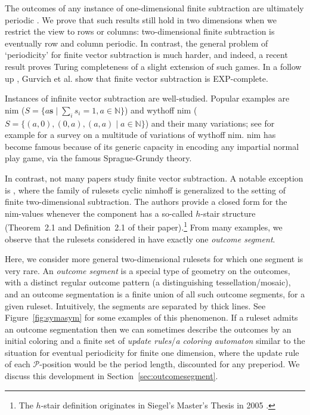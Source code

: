 \documentclass{amsart}
\theoremstyle{plain}
\theoremstyle{definition}
\renewcommand{\P}{\ensuremath{\mathcal P}}
\newcommand{\n}{\mathbb N}
\newcommand{\s}{\boldsymbol s}
\begin{document}
The outcomes of any instance of {\sc one-dimensional finite subtraction} are ultimately periodic \cite{golomb1966mathematical}. We prove that such results still hold in two dimensions when we restrict the view to rows or columns: {\sc two-dimensional finite subtraction} is eventually row and column periodic. In contrast, the general problem of `periodicity' for {\sc finite vector subtraction} is much harder, and indeed, a recent result \cite{larsson2013impartial, larsson2013heaps} proves Turing completeness of a slight extension of such games. In a follow up \cite{Gurvich}, 
Gurvich et al. show that {\sc finite  vector subtraction} is EXP-complete.



Instances of {\sc infinite vector subtraction} are well-studied. Popular examples are {\sc nim} ($S=\{a\s\mid \sum_{i} s_i=1,a\in \n\}$) and {\sc wythoff nim} \cite{wythoff1907modification} ($S=\{(a,0),(0,a),(a,a)\mid a\in \n\}$) and their many variations; see for example \cite{duchene2019wythoff} for a survey on a multitude of variations of {\sc wythoff nim}. {\sc nim} has become famous because of its generic capacity in encoding any impartial normal play game, via the famous Sprague-Grundy theory. 

In contrast, not many papers study {\sc finite vector subtraction}. A notable exception is \cite{abuku2019combination}, where the family of rulesets  {\sc cyclic nimhoff} \cite{fraenkel1991nimhoff} is generalized to the setting of {\sc finite two-dimensional subtraction}. The authors provide a  closed form for the nim-values whenever the component has a  so-called $h$-stair  structure (Theorem~2.1 and Definition~2.1 of their paper).\footnote{The $h$-stair definition originates in Siegel's Master's Thesis in 2005 \cite{siegel2005finite}.} From many examples, we observe that the rulesets considered in \cite{abuku2019combination} have exactly one {\em outcome segment}. 

Here, we consider more general two-dimensional rulesets for which one segment is very rare. An {\em outcome segment} is a  special type of geometry on the outcomes, with a distinct regular outcome pattern (a distinguishing tessellation/mosaic), and an outcome segmentation is a finite union of all such outcome segments, for a given ruleset. Intuitively, the segments are separated by thick lines. See Figure~\ref{fig:symasym} for some examples of this phenomenon. If a ruleset admits an outcome segmentation then we can sometimes describe the outcomes by an initial coloring and a finite set of {\em update rules}/{\em a coloring automaton} similar to the situation for eventual periodicity for {\sc finite one dimension},  where the update rule of each \P-position would be the period length, discounted for any preperiod. We discuss this development in Section~\ref{sec:outcomesegment}. 
\end{document}
